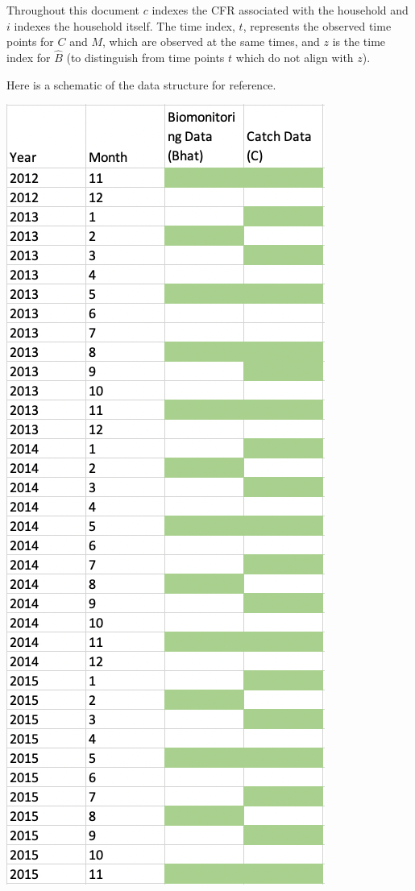 \documentclass[
]{article}
\begin{document}
Throughout this document \(c\) indexes the CFR associated with the
household and \(i\) indexes the household itself. The time index, \(t\),
represents the observed time points for \(C\) and \(M\), which are
observed at the same times, and \(z\) is the time index for \(\hat{B}\)
(to distinguish from time points \(t\) which do not align with \(z\)).

Here is a schematic of the data structure for reference.

\includegraphics{images/data_structure1.png}
\end{document}
